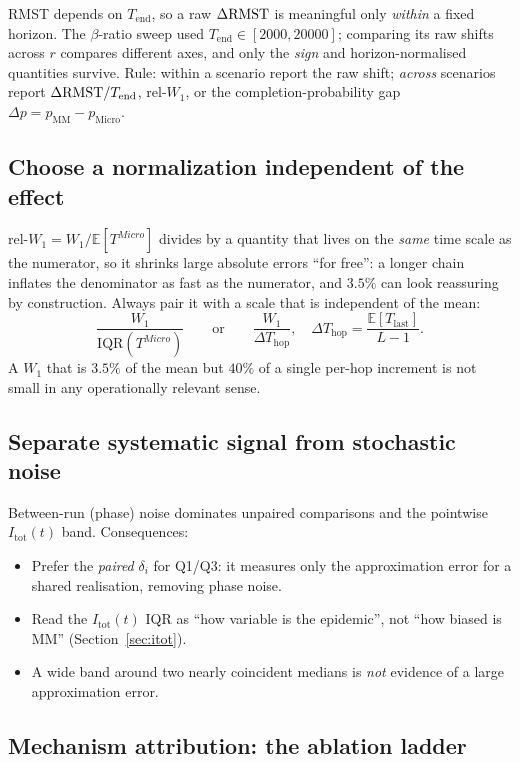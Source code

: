 \documentclass[11pt,a4paper]{article}
\begin{document}
RMST depends on $T_{\mathrm{end}}$, so a raw $\Delta\mathrm{RMST}$ is meaningful only
\emph{within} a fixed horizon.  The $\beta$-ratio sweep used
$T_{\mathrm{end}}\in[2000,20000]$; comparing its raw shifts across $r$ compares
different axes, and only the \emph{sign} and horizon-normalised quantities
survive.  Rule: within a scenario report the raw shift; \emph{across} scenarios
report $\Delta\mathrm{RMST}/T_{\mathrm{end}}$, rel-$W_1$, or the completion-probability gap
$\Delta p = p_{\mathrm{MM}}-p_{\mathrm{Micro}}$.

\subsection{Choose a normalization independent of the effect}
\label{sec:norm}

\mbox{rel-}$W_1 = W_1 / \mathbb{E}[T^{Micro}]$ divides by a quantity that lives
on the \emph{same} time scale as the numerator, so it shrinks large absolute
errors ``for free'': a longer chain inflates the denominator as fast as the
numerator, and $3.5\%$ can look reassuring by construction.  Always pair it with
a scale that is independent of the mean:
\[
  \frac{W_1}{\mathrm{IQR}(T^{Micro})}
  \qquad\text{or}\qquad
  \frac{W_1}{\Delta T_{\mathrm{hop}}},\quad
  \Delta T_{\mathrm{hop}} = \frac{\mathbb{E}[T_{\mathrm{last}}]}{L-1}.
\]
A $W_1$ that is $3.5\%$ of the mean but $40\%$ of a single per-hop increment is
not small in any operationally relevant sense.

\subsection{Separate systematic signal from stochastic noise}

Between-run (phase) noise dominates unpaired comparisons and the pointwise
$I_{\mathrm{tot}}(t)$ band.  Consequences:
\begin{itemize}
  \item Prefer the \emph{paired} $\delta_i$ for Q1/Q3: it measures only the
        approximation error for a shared realisation, removing phase noise.
  \item Read the $I_{\mathrm{tot}}(t)$ IQR as ``how variable is the epidemic'',
        not ``how biased is MM'' (Section~\ref{sec:itot}).
  \item A wide band around two nearly coincident medians is \emph{not} evidence
        of a large approximation error.
\end{itemize}

\subsection{Mechanism attribution: the ablation ladder}
\label{sec:ladder}
\end{document}
